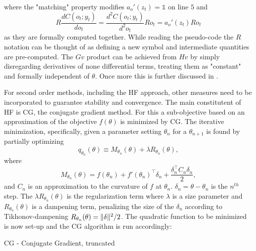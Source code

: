 where the "matching" property modifies $a_o'(z_t) = \mathds{1}$ on line $5$ and \[R\frac{dC(o_t; y_t)}{d o_t} = \frac{d^2C(o_t; y_t)}{d^2o_t} Ro_t =  a_o'(z_t)  Ro_t\] as they are formally computed together. While reading the pseudo-code the $R$ notation can be thought of as defining a new symbol and intermediate quantities are pre-computed. The $Gv$ product can be achieved from $Hv$ by simply disregarding derivatives of none differential terms, treating them as "constant" and formally independent of $\theta$. Once more this is further discussed in \cite{suts}.

For second order methods, including the HF approach, other measures need to be incorporated to guarantee stability and convergence. The main constitutent of HF is CG, the conjugate gradient method. For this a sub-objective based on an approximation of the objective $f(\theta)$ is minimized by CG. The iterative minimization, specifically, given a parameter setting $\theta_n$ for a $\theta_{n+1}$ is found by partially optimizing \[q_{\theta_n} (\theta) \equiv M_{\theta_n}(\theta) + \lambda R_{\theta_n}(\theta),\] where \[M_{\theta_n}(\theta) = f(\theta_n) + f'(\theta_n)^\top \delta_n + \frac{\delta_n^\top C_n \delta_n}{2},\] and $C_n$ is an approximation to the curvature of $f$ at $\theta_n$. $\delta_n = \theta - \theta_n$ is the $n^{th}$ step. The $\lambda R_{\theta_n}(\theta)$ is the regularization term where $\lambda$ is a size parameter and $R_{\theta_n}(\theta)$ is a dampening term, penalizing the size of the $\delta_n$ according to Tikhonov-dampening $R_{\theta_n}(\theta) = \lVert\delta\rVert^2/2$. The quadratic function to be minimized is now set-up and the CG algorithm is run accordingly:

\begin{algorithm}
    \caption{CG - Conjugate Gradient, truncated}
    \begin{algorithmic}[1]
        \EndWhile
    \end{algorithmic}
\end{algorithm}

